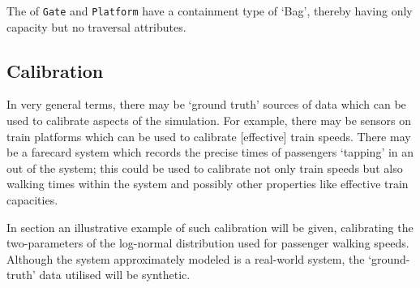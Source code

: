 The  of {\tt Gate} and {\tt Platform} have a containment type of `Bag', thereby having only capacity
but no traversal attributes.


\subsection{Calibration}

In very general terms, there may be `ground truth' sources of data
which can be used to calibrate aspects of the simulation. For example,
there may be sensors on train platforms which can be used to calibrate
[effective] train speeds. There may be a farecard system which records
the precise times of passengers `tapping' in an out of the system;
this could be used to calibrate not only train speeds but also walking
times within the system and possibly other properties like effective
train capacities.

In section  an illustrative example of such
calibration will be given, calibrating the two-parameters of the
log-normal distribution used for passenger walking speeds.  Although
the system approximately modeled is a real-world system, the
`ground-truth' data utilised will be synthetic.
